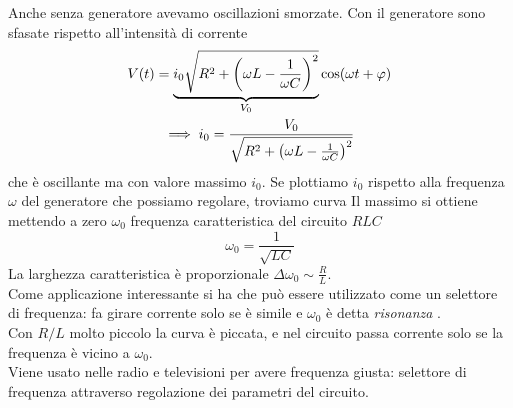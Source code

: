 Anche senza generatore avevamo oscillazioni smorzate. Con il generatore sono sfasate rispetto all'intensità di corrente
\begin{gather*}
	V(t)=\underbrace{i_0 \sqrt{R^2 +\left(\omega L-\frac{1}{\omega C}\right)^2}}_{V_0} \cos(\omega t+\oldphi) \\
	\implies i_0=\frac{V_0}{\sqrt{R^2 +\left(\omega L-\frac{1}{\omega C}\right)^2}}
\end{gather*}
che è oscillante ma con valore massimo $i_0$. Se plottiamo $i_0$ rispetto alla frequenza $\omega$ del generatore che possiamo regolare, troviamo curva
Il massimo si ottiene mettendo a zero $\omega_0$ frequenza caratteristica del circuito $RLC$	
\begin{equation*}
	\omega_0=\frac{1}{\sqrt{LC}}
\end{equation*}
La larghezza caratteristica è proporzionale $\Delta\omega_0\sim\frac{R}{L}$.\\
Come applicazione interessante si ha che può essere utilizzato come un selettore di frequenza: fa girare corrente solo se è simile e $\omega_0$ è detta \textit{risonanza} .\\
Con $R/L$ molto piccolo la curva è piccata, %
e nel circuito passa corrente solo se la frequenza è vicino a $\omega_0$.\\
Viene usato nelle radio e televisioni per avere frequenza giusta: selettore di frequenza attraverso regolazione dei parametri del circuito.



%
